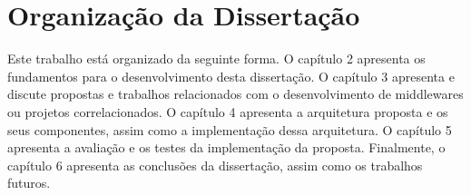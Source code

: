 \section{Organização da Dissertação}

Este trabalho está organizado da seguinte forma. O capítulo 2 apresenta
os fundamentos para o desenvolvimento desta dissertação. O capítulo
3 apresenta e discute propostas e trabalhos relacionados com o desenvolvimento
de middlewares ou projetos correlacionados. O capítulo 4 apresenta
a arquitetura proposta e os seus componentes, assim como a implementação
dessa arquitetura. O capítulo 5 apresenta a avaliação e os testes
da implementação da proposta. Finalmente, o capítulo 6 apresenta as
conclusões da dissertação, assim como os trabalhos futuros. 
